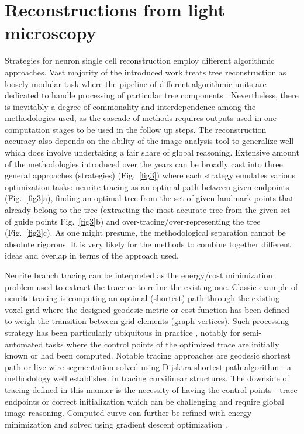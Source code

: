 \section{Reconstructions from light microscopy}
\label{sec:reconstructions}
Strategies for neuron single cell reconstruction employ different algorithmic approaches. Vast majority of the introduced work treats tree reconstruction as loosely modular task where the pipeline of different algorithmic units are dedicated to handle processing of particular tree components \cite{meijering2010neuron}. Nevertheless, there is inevitably a degree of commonality and interdependence among the methodologies used, as the cascade of methods requires outputs used in one computation stages to be used in the follow up steps. The reconstruction accuracy also depends on the ability of the image analysis tool to generalize well which does involve undertaking a fair share of global reasoning. Extensive amount of the methodologies introduced over the years \cite{meijering2010neuron,donohue2011automated,acciai2016automated} can be broadly cast into three general approaches (strategies) (Fig.~\ref{fig3}) where each strategy emulates various optimization tasks: neurite tracing as an optimal path between given endpoints (Fig.~\ref{fig3}a), finding an optimal tree from the set of given landmark points that already belong to the tree (extracting the most accurate tree from the given set of guide points Fig.~\ref{fig3}b) and over-tracing/over-representing the tree (Fig.~\ref{fig3}c). As one might presume, the methodological separation cannot be absolute rigorous. It is very likely for the methods to combine together different ideas and overlap in terms of the approach used.

Neurite branch tracing can be interpreted as the energy/cost minimization problem \cite{meijering2004design,peng2010automatic} used to extract the trace or to refine the existing one. Classic example of neurite tracing is computing an optimal (shortest) path through the existing voxel grid where the designed geodesic metric or cost function has been defined to weigh the transition between grid elements (graph vertices). Such processing strategy has been particularly ubiquitous in practice \cite{meijering2004design,peng2010v3d,longair2011simple}, notably for semi-automated tasks where the control points of the optimized trace are initially known or had been computed. Notable tracing approaches are geodesic shortest path \cite{peng2010automatic} or live-wire segmentation \cite{meijering2004design} solved using Dijsktra shortest-path algorithm \cite{dijkstra1959note} - a methodology well established in tracing curvilinear structures. The downside of tracing defined in this manner is the necessity of having the control points - trace endpoints or correct initialization which can be challenging and require global image reasoning. Computed curve can further be refined with energy minimization and solved using gradient descent optimization \cite{peng2007straightening,peng2010automatic}. 

